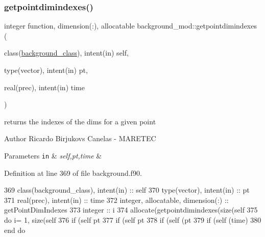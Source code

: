 \subsubsection{\texorpdfstring{getpointdimindexes()}{getpointdimindexes()}}
{\footnotesize\ttfamily integer function, dimension(\+:), allocatable background\+\_\+mod\+::getpointdimindexes (\begin{DoxyParamCaption}\item[{class(\mbox{\hyperlink{structbackground__mod_1_1background__class}{background\+\_\+class}}), intent(in)}]{self,  }\item[{type(vector), intent(in)}]{pt,  }\item[{real(prec), intent(in)}]{time }\end{DoxyParamCaption})\hspace{0.3cm}{\ttfamily [private]}}



returns the indexes of the dims for a given point 

\begin{DoxyAuthor}{Author}
Ricardo Birjukovs Canelas -\/ M\+A\+R\+E\+T\+EC 
\end{DoxyAuthor}

\begin{DoxyParams}[1]{Parameters}
\mbox{\tt in}  & {\em self,pt,time} & \\
\hline
\end{DoxyParams}


Definition at line 369 of file background.\+f90.


\begin{DoxyCode}
369     \textcolor{keywordtype}{class}(background\_class), \textcolor{keywordtype}{intent(in)} :: self
370     \textcolor{keywordtype}{type}(vector), \textcolor{keywordtype}{intent(in)} :: pt
371     \textcolor{keywordtype}{real(prec)}, \textcolor{keywordtype}{intent(in)} :: time
372     \textcolor{keywordtype}{integer}, \textcolor{keywordtype}{allocatable}, \textcolor{keywordtype}{dimension(:)} :: getPointDimIndexes
373     \textcolor{keywordtype}{integer} :: i
374     \textcolor{keyword}{allocate}(getpointdimindexes(\textcolor{keyword}{size}(self%
375     \textcolor{keywordflow}{do} i= 1, \textcolor{keyword}{size}(self%
376         \textcolor{keywordflow}{if} (self%
      pt%
377         \textcolor{keywordflow}{if} (self%
      pt%
378         \textcolor{keywordflow}{if} (self%
      (pt%
379         \textcolor{keywordflow}{if} (self%
      (time)
380 \textcolor{keywordflow}{    end do}
\end{DoxyCode}
\mbox{\label{namespacebackground__mod_a09d61976c4545e8753eb4594044b109d}} 
